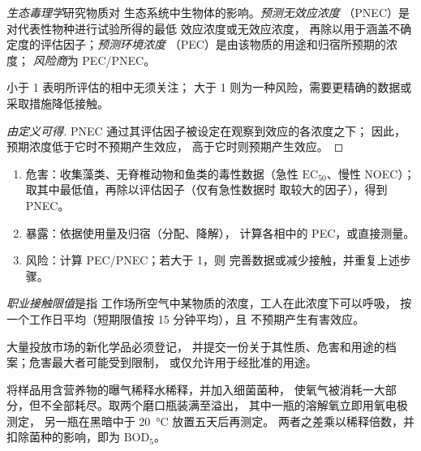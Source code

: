 \begin{definition}[生态毒理学]\label{def:b3:environmental-toxicology:ecotoxicology}
\emph{生态毒理学}研究物质对
生态系统中生物体的影响。\emph{预测无效应浓度}
（PNEC）是对代表性物种进行试验所得的最低
效应浓度或无效应浓度，
再除以用于涵盖不确定度的评估因子；\emph{预测环境浓度}
（PEC）是由该物质的用途和归宿所预期的浓度；
\emph{风险商}为
PEC/PNEC。
\end{definition}

\begin{proposition}[风险商]\label{prop:b3:environmental-toxicology:risk-quotient}
小于 1 表明所评估的相中无须关注；
大于 1 则为一种风险，需要更精确的数据或采取措施降低接触。
\end{proposition}

\begin{proof}[由定义可得]
PNEC 通过其评估因子被设定在观察到效应的各浓度之下；
因此，预期浓度低于它时不预期产生效应，
高于它时则预期产生效应。
\end{proof}

\begin{method}[环境风险评估]\label{met:b3:environmental-toxicology:risk}
\begin{enumerate}
  \item 危害：收集藻类、无脊椎动物和鱼类的毒性数据（急性
        $\mathrm{EC_{50}}$、慢性 NOEC）；取其中最低值，再除以评估因子（仅有急性数据时
        取较大的因子），得到 PNEC。
  \item 暴露：依据使用量及归宿（分配、降解），
        计算各相中的 PEC，或直接测量。
  \item 风险：计算 PEC/PNEC；若大于 1，则
        完善数据或减少接触，并重复上述步骤。
\end{enumerate}
\end{method}

\begin{definition}[职业接触限值]\label{def:b3:environmental-toxicology:oel}
\emph{职业接触限值}是指
工作场所空气中某物质的浓度，工人在此浓度下可以呼吸，
按一个工作日平均（短期限值按 15 分钟平均），且
不预期产生有害效应。
\end{definition}

大量投放市场的新化学品必须登记，
并提交一份关于其性质、危害和用途的档案；危害最大者可能受到限制，
或仅允许用于经批准的用途。

\begin{inthelab}
将样品用含营养物的曝气稀释水稀释，并加入细菌菌种，
使氧气被消耗一大部分，但不全部耗尽。取两个磨口瓶装满至溢出，
其中一瓶的溶解氧立即用氧电极测定，
另一瓶在黑暗中于 \qty{20}{\celsius} 放置五天后再测定。
两者之差乘以稀释倍数，并扣除菌种的影响，即为
$\mathrm{BOD_5}$。
\end{inthelab}

